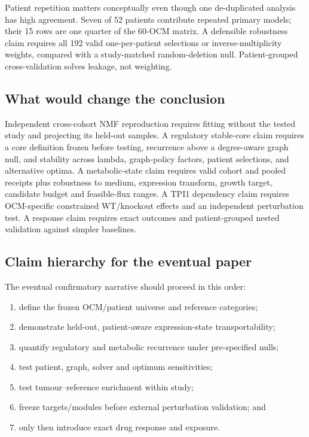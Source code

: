 \documentclass[10pt]{article}
\begin{document}
Patient repetition matters conceptually even though one de-duplicated analysis
has high agreement.  Seven of 52 patients contribute repeated primary models;
their 15 rows are one quarter of the 60-OCM matrix.  A defensible robustness
claim requires all 192 valid one-per-patient selections or inverse-multiplicity
weights, compared with a study-matched random-deletion null.  Patient-grouped
cross-validation solves leakage, not weighting.

\subsection{What would change the conclusion}

Independent cross-cohort NMF reproduction requires fitting without the tested
study and projecting its held-out samples.  A regulatory stable-core claim
requires a core definition frozen before testing, recurrence above a
degree-aware graph null, and stability across lambda, graph-policy factors,
patient selections, and alternative optima.  A metabolic-state claim requires
valid cohort and pooled receipts plus robustness to medium, expression
transform, growth target, candidate budget and feasible-flux ranges.  A TPI1
dependency claim requires OCM-specific constrained WT/knockout effects and an
independent perturbation test.  A response claim requires exact outcomes and
patient-grouped nested validation against simpler baselines.

\subsection{Claim hierarchy for the eventual paper}

The eventual confirmatory narrative should proceed in this order:

\begin{enumerate}[leftmargin=*]
  \item define the frozen OCM/patient universe and reference categories;
  \item demonstrate held-out, patient-aware expression-state transportability;
  \item quantify regulatory and metabolic recurrence under pre-specified nulls;
  \item test patient, graph, solver and optimum sensitivities;
  \item test tumour--reference enrichment within study;
  \item freeze targets/modules before external perturbation validation; and
  \item only then introduce exact drug response and exposure.
\end{enumerate}
\end{document}
